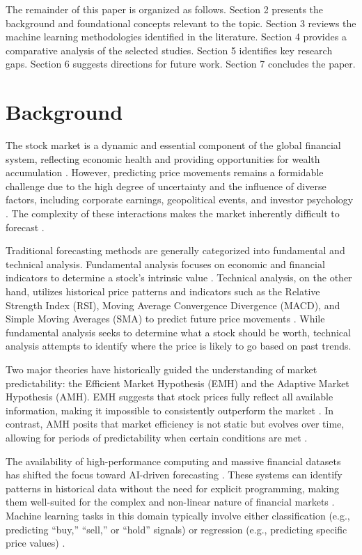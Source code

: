 \documentclass[11pt,a4paper]{article}
\begin{document}
The remainder of this paper is organized as follows. Section 2 presents the background and
foundational concepts relevant to the topic. Section 3 reviews the machine learning methodologies
identified in the literature. Section 4 provides a comparative analysis of the selected studies. Section
5 identifies key research gaps. Section 6 suggests directions for future work. Section 7 concludes the
paper.

\section{Background}

The stock market is a dynamic and essential component of the global financial system, reflecting
economic health and providing opportunities for wealth accumulation \cite{strader2020}. However,
predicting price movements remains a formidable challenge due to the high degree of uncertainty and
the influence of diverse factors, including corporate earnings, geopolitical events, and investor
psychology \cite{khan2022,subasi2021}. The complexity of these interactions makes the market
inherently difficult to forecast \cite{kumar2022}.

Traditional forecasting methods are generally categorized into fundamental and technical analysis.
Fundamental analysis focuses on economic and financial indicators to determine a stock's intrinsic
value \cite{mokhtari2021}. Technical analysis, on the other hand, utilizes historical price patterns
and indicators such as the Relative Strength Index (RSI), Moving Average Convergence Divergence
(MACD), and Simple Moving Averages (SMA) to predict future price movements \cite{subasi2021}.
While fundamental analysis seeks to determine what a stock should be worth, technical analysis
attempts to identify where the price is likely to go based on past trends.

Two major theories have historically guided the understanding of market predictability: the Efficient
Market Hypothesis (EMH) and the Adaptive Market Hypothesis (AMH). EMH suggests that stock
prices fully reflect all available information, making it impossible to consistently outperform the
market \cite{chopra2021}. In contrast, AMH posits that market efficiency is not static but evolves
over time, allowing for periods of predictability when certain conditions are met \cite{mokhtari2021}.

The availability of high-performance computing and massive financial datasets has shifted the focus
toward AI-driven forecasting \cite{subasi2021}. These systems can identify patterns in historical data
without the need for explicit programming, making them well-suited for the complex and non-linear
nature of financial markets \cite{sonkavde2023}. Machine learning tasks in this domain typically
involve either classification (e.g., predicting ``buy,'' ``sell,'' or ``hold'' signals) or regression (e.g.,
predicting specific price values) \cite{akhtar2022}.
\end{document}
